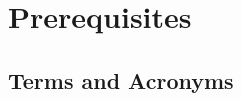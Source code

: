 \documentclass[
]{book}
\begin{document}
\hypertarget{prerequisites-1}{%
\chapter*{Prerequisites}\label{prerequisites-1}}

\hypertarget{terms-and-acronyms-1}{%
\section*{Terms and Acronyms}\label{terms-and-acronyms-1}}

\providecommand{\docline}[3]{\noalign{\global\setlength{\arrayrulewidth}{#1}}\arrayrulecolor[HTML]{#2}\cline{#3}}

\setlength{\tabcolsep}{2pt}

\renewcommand*{\arraystretch}{1.5}
\end{document}
